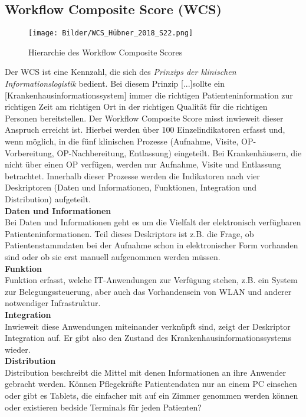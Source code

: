 \subsection{Workflow Composite Score (WCS)}
	\begin{figure}[ht]
		\centering
		\texttt{[image: Bilder/WCS\_Hübner\_2018\_S22.png]}
		\caption{Hierarchie des Workflow Composite Scores \parencite[22]{huebner2018}}
		\label{fig:WCS}
	\end{figure}
	Der WCS ist eine Kennzahl, die sich des \textit{Prinzips der klinischen Informationslogistik} bedient. Bei diesem Prinzip \glqq{}[...]sollte ein [Krankenhausinformationssystem] immer die richtigen Patienteninformation zur richtigen Zeit am richtigen Ort in der richtigen Qualität für die richtigen Personen bereitstellen\grqq{ }\parencite[36]{huebner2019}. Der Workflow Composite Score misst inwieweit dieser Anspruch erreicht ist. Hierbei werden über 100 Einzelindikatoren erfasst und, wenn möglich, in die fünf klinischen Prozesse (Aufnahme, Visite, OP-Vorbereitung, OP-Nachbereitung, Entlassung) eingeteilt. Bei Krankenhäusern, die nicht über einen OP verfügen, werden nur Aufnahme, Visite und Entlassung betrachtet. Innerhalb dieser Prozesse werden die Indikatoren nach vier Deskriptoren (Daten und Informationen, Funktionen, Integration und Distribution) aufgeteilt. \parencite{huebner2019}
	\vspace{\parheadvspace}\\
	\textbf{Daten und Informationen}\\
	Bei Daten und Informationen geht es um die Vielfalt der elektronisch verfügbaren Patienteninformationen. Teil dieses Deskriptors ist z.B. die Frage, ob Patientenstammdaten bei der Aufnahme schon in elektronischer Form vorhanden sind oder ob sie erst manuell aufgenommen werden müssen. 
	\vspace{\parheadvspace}\\
	\textbf{Funktion}\\
	Funktion erfasst, welche IT-Anwendungen zur Verfügung stehen, z.B. ein System zur Belegungssteuerung, aber auch das Vorhandensein von WLAN und anderer notwendiger Infrastruktur.
	\vspace{\parheadvspace}\\
	\textbf{Integration}\\
	Inwieweit diese Anwendungen miteinander verknüpft sind, zeigt der Deskriptor Integration auf. Er gibt also den Zustand des Krankenhausinformationssystems wieder.
	\vspace{\parheadvspace}\\
	\textbf{Distribution}\\
	Distribution beschreibt die Mittel mit denen Informationen an ihre Anwender gebracht werden. Können Pflegekräfte Patientendaten nur an einem PC einsehen oder gibt es Tablets, die einfacher mit auf ein Zimmer genommen werden können oder existieren bedside Terminals für jeden Patienten?\\

